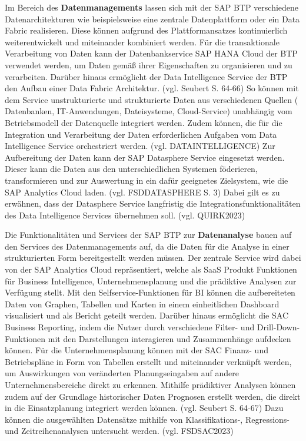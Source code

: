 Im Bereich des \textbf{Datenmanagements} lassen sich mit der SAP BTP verschiedene Datenarchitekturen wie beispielsweise eine zentrale Datenplattform oder ein Data Fabric realisieren. Diese können aufgrund des Plattformansatzes kontinuierlich weiterentwickelt und miteinander kombiniert werden. Für die transaktionale Verarbeitung von Daten kann der Datenbankservice SAP HANA Cloud der BTP verwendet werden, um Daten gemäß ihrer Eigenschaften zu organisieren und zu verarbeiten. Darüber hinaus ermöglicht der Data Intelligence Service der BTP den Aufbau einer Data Fabric Architektur. (vgl. Seubert S. 64-66) So können mit dem Service unstrukturierte und strukturierte Daten aus verschiedenen Quellen ( Datenbanken, IT-Anwendungen, Dateisysteme, Cloud-Service) unabhängig vom Betriebsmodell der Datenquelle integriert werden. Zudem können, die für die Integration und Verarbeitung der Daten erforderlichen Aufgaben vom Data Intelligence Service orchestriert werden. (vgl. DATAINTELLIGENCE) Zur Aufbereitung der Daten kann der SAP Datasphere Service eingesetzt werden. Dieser kann die Daten aus den unterschiedlichen Systemen föderieren, transformieren und zur Auswertung in ein dafür geeignetes Zielsystem, wie die SAP Analytics Cloud laden. (vgl. FSDDATASPHERE S. 3) Dabei gilt es zu erwähnen, dass der Datasphere Service langfristig die Integrationsfunktionalitäten des Data Intelligence Services übernehmen soll. (vgl. QUIRK2023)

Die Funktionalitäten und Services der SAP BTP zur \textbf{Datenanalyse} bauen auf den Services des Datenmanagements auf, da die Daten für die Analyse in einer strukturierten Form bereitgestellt werden müssen. Der zentrale Service wird dabei von der SAP Analytics Cloud repräsentiert, welche als SaaS Produkt Funktionen für Business Intelligence, Unternehmensplanung und die prädiktive Analysen zur Verfügung stellt. Mit den Selfservice-Funktionen für BI können die aufbereiteten Daten von Graphen, Tabellen und Karten in einem einheitlichen Dashboard visualisiert und als Bericht geteilt werden. Darüber hinaus ermöglicht die SAC Business Reporting, indem die Nutzer durch verschiedene Filter- und Drill-Down-Funktionen mit den Darstellungen interagieren und Zusammenhänge aufdecken können. Für die Unternehmensplanung können mit der SAC Finanz- und Betriebspläne in Form von Tabellen erstellt und miteinander verknüpft werden, um Auswirkungen von veränderten Planungseingaben auf andere Unternehmensbereiche direkt zu erkennen. Mithilfe prädiktiver Analysen können zudem auf der Grundlage historischer Daten Prognosen erstellt werden, die direkt in die Einsatzplanung integriert werden können. (vgl. Seubert S. 64-67) Dazu können die ausgewählten Datensätze mithilfe von Klassifikations-, Regressions- und Zeitreihenanalysen untersucht werden. (vgl. FSDSAC2023)

